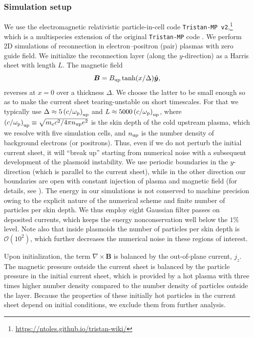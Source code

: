 \subsubsection{Simulation setup} 
\label{sec:reconnection-setup}
We use the electromagnetic relativistic particle-in-cell code \texttt{Tristan-MP v2},\footnote{\url{https://ntoles.github.io/tristan-wiki/}} which is a multispecies extension of the original \texttt{Tristan-MP} code \citep{2005AIPC..801..345S}. 
We perform 2D simulations of reconnection in electron--positron (pair) plasmas with zero guide field. We initialize the reconnection layer (along the $y$-direction) as a Harris sheet with length $L$. The magnetic field 
\begin{equation}
    \bm{B} = B_{\rm up} \tanh(x/\Delta) \hat{\bm{y}},
\end{equation} 
reverses at $x=0$ over a thickness $\Delta$. We choose the latter to be small enough so as to make the current sheet tearing-unstable on short timescales. For that we typically use $\Delta\approx 5\left(c/\omega_{\rm p}\right)_{\rm up}$ and $L\approx 5000\left(c/\omega_{\rm p}\right)_{\rm up}$, where $\left(c/\omega_{\rm p}\right)_{\rm up} \equiv \sqrt{m_e c^2/ 4\pi n_{\rm up} e^2}$ is the skin depth of the cold upstream plasma, which we resolve with five simulation cells, and $n_{\rm up}$ is the number density of background electrons (or positrons). Thus, even if we do not perturb the initial current sheet, it will ``break up'' starting from numerical noise with a subsequent development of the plasmoid instability. We use periodic boundaries in the $y$-direction (which is parallel to the current sheet), while in the other direction our boundaries are open with constant injection of plasma and magnetic field (for details, see \citealt{2014ApJ...783L..21S}). The energy in our simulations is not conserved to machine precision owing to the explicit nature of the numerical scheme and finite number of particles per skin depth. We thus employ eight Gaussian filter passes on deposited currents, which keeps the energy nonconservation well below the $1\%$ level. Note also that inside plasmoids the number of particles per skin depth is $\mathcal{O}(10^2)$, which further decreases the numerical noise in these regions of interest.

Upon initialization, the term $\nabla\times\bm{B}$ is balanced by the out-of-plane current, $j_z$. The magnetic pressure outside the current sheet is balanced by the particle pressure in the initial current sheet, which is provided by a hot plasma with three times higher number density compared to the number density of particles outside the layer. Because the properties of these initially hot particles in the current sheet depend on initial conditions, we exclude them from further analysis.
  
